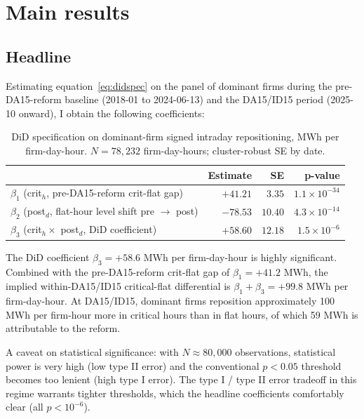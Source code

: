 \documentclass[11pt,a4paper]{article}
\begin{document}
\section{Main results}

\subsection{Headline}

Estimating equation~\eqref{eq:didspec} on the panel of dominant firms during the pre-DA15-reform baseline (2018-01 to 2024-06-13) and the DA15/ID15 period (2025-10 onward), I obtain the following coefficients:

\begin{table}[h]
  \centering
  \begin{tabular}{lrrr}
    \toprule
                                                                       & Estimate            & SE       & p-value \\
    \midrule
    $\beta_1$ (crit$_h$, pre-DA15-reform crit-flat gap)                & $+41.21$            & $3.35$   & $1.1 \times 10^{-34}$ \\
    $\beta_2$ (post$_d$, flat-hour level shift pre $\to$ post)         & $-78.53$            & $10.40$  & $4.3 \times 10^{-14}$ \\
    $\beta_3$ (crit$_h \times$ post$_d$, DiD coefficient)              & $\mathbf{+58.60}$   & $12.18$  & $1.5 \times 10^{-6}$ \\
    \bottomrule
  \end{tabular}
  \caption{DiD specification on dominant-firm signed intraday repositioning, MWh per firm-day-hour. $N = 78{,}232$ firm-day-hours; cluster-robust SE by date.}
  \label{tab:headline}
\end{table}

The DiD coefficient $\beta_3 = +58.6$ MWh per firm-day-hour is highly significant. Combined with the pre-DA15-reform crit-flat gap of $\beta_1 = +41.2$ MWh, the implied within-DA15/ID15 critical-flat differential is $\beta_1 + \beta_3 = +99.8$ MWh per firm-day-hour. At DA15/ID15, dominant firms reposition approximately 100 MWh per firm-hour more in critical hours than in flat hours, of which 59 MWh is attributable to the reform.

A caveat on statistical significance: with $N \approx 80{,}000$ observations, statistical power is very high (low type II error) and the conventional $p < 0.05$ threshold becomes too lenient (high type I error). The type I / type II error tradeoff in this regime warrants tighter thresholds, which the headline coefficients comfortably clear (all $p < 10^{-6}$).
\end{document}
